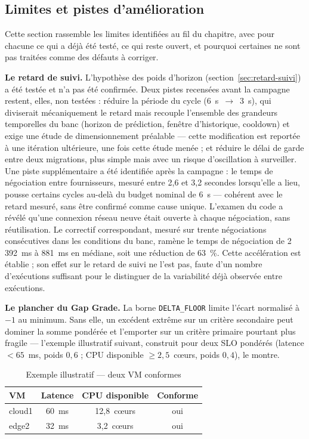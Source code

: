 \subsection{Limites et pistes d'amélioration}
\label{sec:limites-ameliorations}

Cette section rassemble les limites identifiées au fil du chapitre, avec pour chacune ce qui a déjà été testé, ce qui reste ouvert, et pourquoi certaines ne sont pas traitées comme des défauts à corriger.

\textbf{Le retard de suivi.} L'hypothèse des poids d'horizon (section~\ref{sec:retard-suivi}) a été testée et n'a pas été confirmée. Deux pistes recensées avant la campagne restent, elles, non testées : réduire la période du cycle (6~s~$\rightarrow$~3~s), qui diviserait mécaniquement le retard mais recouple l'ensemble des grandeurs temporelles du banc (horizon de prédiction, fenêtre d'historique, cooldown) et exige une étude de dimensionnement préalable — cette modification est reportée à une itération ultérieure, une fois cette étude menée ; et réduire le délai de garde entre deux migrations, plus simple mais avec un risque d'oscillation à surveiller. Une piste supplémentaire a été identifiée après la campagne : le temps de négociation entre fournisseurs, mesuré entre 2,6 et 3,2 secondes lorsqu'elle a lieu, pousse certains cycles au-delà du budget nominal de 6~s — cohérent avec le retard mesuré, sans être confirmé comme cause unique. L'examen du code a révélé qu'une connexion réseau neuve était ouverte à chaque négociation, sans réutilisation. Le correctif correspondant, mesuré sur trente négociations consécutives dans les conditions du banc, ramène le temps de négociation de 2\,392~ms à 881~ms en médiane, soit une réduction de 63~\%. Cette accélération est établie ; son effet sur le retard de suivi ne l'est pas, faute d'un nombre d'exécutions suffisant pour le distinguer de la variabilité déjà observée entre exécutions.

\textbf{Le plancher du Gap Grade.} La borne \texttt{DELTA\_FLOOR} limite l'écart normalisé à $-1$ au minimum. Sans elle, un excédent extrême sur un critère secondaire peut dominer la somme pondérée et l'emporter sur un critère primaire pourtant plus fragile — l'exemple illustratif suivant, construit pour deux SLO pondérés (latence $< 65$~ms, poids $0{,}6$ ; CPU disponible $\geq 2{,}5$~cœurs, poids $0{,}4$), le montre.

\begin{table}[H]
    \centering
    \caption{Exemple illustratif — deux VM conformes}
    \label{tab:floor-exemple-entree}
    \begin{tabular}{lccc}
        \toprule
        \textbf{VM} & \textbf{Latence} & \textbf{CPU disponible} & \textbf{Conforme} \\
        \midrule
        cloud1 & 60~ms & 12,8~cœurs & oui \\
        edge2  & 32~ms &  3,2~cœurs & oui \\
        \bottomrule
    \end{tabular}
\end{table}


